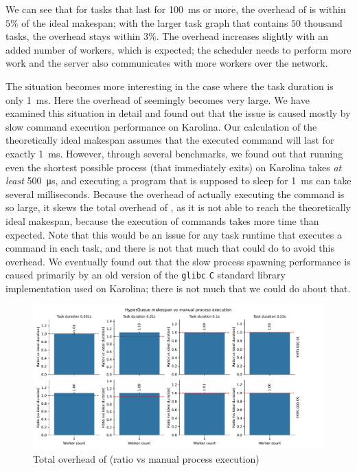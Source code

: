 We can see that for tasks that last for \SI{100}{\milli\second} or more, the overhead of
\hyperqueue{} is within $5\%$ of the ideal makespan; with the larger
task graph that contains $50$ thousand tasks, the overhead stays within
$3\%$. The overhead increases slightly with an added number of workers, which is
expected; the scheduler needs to perform more work and the server also communicates with more
workers over the network.

The situation becomes more interesting in the case where the task duration is only
\SI{1}{\milli\second}. Here the overhead of \hyperqueue{} seemingly becomes very large.
We have examined this situation in detail and found out that the issue is caused mostly by slow
command execution performance on Karolina. Our calculation of the theoretically ideal makespan
assumes that the executed command will last for exactly \SI{1}{\milli\second}. However, through
several benchmarks, we found out that running even the shortest possible process (that
immediately exits) on Karolina
takes \emph{at least}
\SI{500}{\micro\second}, and executing a program that is supposed to sleep for
\SI{1}{\milli\second} can take several milliseconds. Because the overhead of actually executing
the command is so large, it skews the total overhead of \hyperqueue{}, as it is not able
to reach the theoretically ideal makespan, because the execution of commands takes more time than
expected. Note that this would be an issue for any task runtime that executes a command in each
task, and there is not that much that \hyperqueue{} could do to avoid this overhead. We
eventually found out that the slow process spawning performance is caused primarily by an old
version of the \texttt{glibc} \texttt{C} standard library implementation used on Karolina; there
is not much that we could do about that.

\begin{figure}[h]
	\centering
	\includegraphics[width=\textwidth]{imgs/hq/charts/total-overhead-vs-manual}
	\caption{Total overhead of \hyperqueue{} (ratio vs manual process execution)}
	\label{fig:hq-overhead-vs-manual}
\end{figure}

